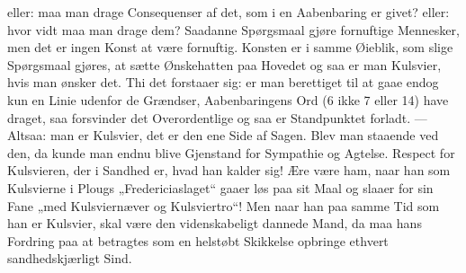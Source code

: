 eller: maa man drage Consequenser af det, som i en Aabenbaring er givet?
eller: hvor vidt maa man drage dem? Saadanne Spørgsmaal gjøre fornuftige
Mennesker, men det er ingen Konst at være fornuftig. Konsten er i samme
Øieblik, som slige Spørgsmaal gjøres, at sætte Ønskehatten paa Hovedet og saa
er man Kulsvier, hvis man ønsker det. Thi det forstaaer sig: er man berettiget
til at gaae endog kun en Linie udenfor de Grændser, Aabenbaringens Ord (6 ikke
7 eller 14) have draget, saa forsvinder det Overordentlige og saa er
Standpunktet forladt. --- Altsaa: man er Kulsvier, det er den ene Side af
Sagen. Blev man staaende ved den, da kunde man endnu blive Gjenstand for
Sympathie og Agtelse. Respect for Kulsvieren, der i Sandhed er, hvad han
kalder sig! Ære være ham, naar han som Kulsvierne i Plougs „Fredericiaslaget“
gaaer løs paa sit Maal og slaaer for sin Fane „med Kulsviernæver og
Kulsviertro“! Men naar han paa samme Tid som han er Kulsvier, skal være den
videnskabeligt dannede Mand, da maa hans Fordring paa
%
at betragtes som en helstøbt Skikkelse opbringe ethvert
sandhedskjærligt Sind.

